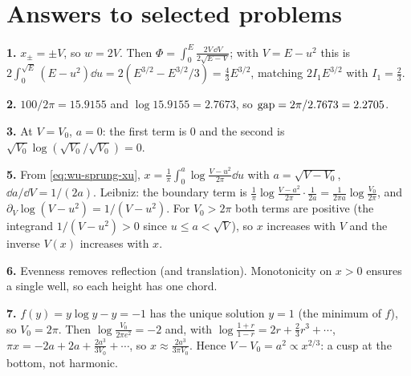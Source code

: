 \begin{problemlist}
\end{problemlist}

\section{Answers to selected problems}

\textbf{1.} $x_\pm=\pm V$, so $w=2V$. Then $\Phi=\int_0^E\frac{2V\,\dd V}{2\sqrt{E-V}}$; with $V=E-u^2$ this is $2\int_0^{\sqrt E}(E-u^2)\dd u=2(E^{3/2}-E^{3/2}/3)=\frac43E^{3/2}$, matching $2I_1E^{3/2}$ with $I_1=\frac23$.

\textbf{2.} $100/2\pi=15.9155$ and $\log15.9155=2.7673$, so $\mathrm{gap}=2\pi/2.7673=2.2705$.

\textbf{3.} At $V=V_0$, $a=0$: the first term is $0$ and the second is $\sqrt{V_0}\log(\sqrt{V_0}/\sqrt{V_0})=0$.

\textbf{5.} From \eqref{eq:wu-sprung-xu}, $x=\frac1\pi\int_0^a\log\frac{V-u^2}{2\pi}\dd u$ with $a=\sqrt{V-V_0}$, $\dd a/\dd V=1/(2a)$. Leibniz: the boundary term is $\frac1\pi\log\frac{V-a^2}{2\pi}\cdot\frac1{2a}=\frac1{2\pi a}\log\frac{V_0}{2\pi}$, and $\partial_V\log(V-u^2)=1/(V-u^2)$. For $V_0>2\pi$ both terms are positive (the integrand $1/(V-u^2)>0$ since $u\le a<\sqrt V$), so $x$ increases with $V$ and the inverse $V(x)$ increases with $x$.

\textbf{6.} Evenness removes reflection (and translation). Monotonicity on $x>0$ ensures a single well, so each height has one chord.

\textbf{7.} $f(y)=y\log y-y=-1$ has the unique solution $y=1$ (the minimum of $f$), so $V_0=2\pi$. Then $\log\frac{V_0}{2\pi e^2}=-2$ and, with $\log\frac{1+r}{1-r}=2r+\frac23r^3+\cdots$, $\pi x=-2a+2a+\frac{2a^3}{3V_0}+\cdots$, so $x\approx\frac{2a^3}{3\pi V_0}$. Hence $V-V_0=a^2\propto x^{2/3}$: a cusp at the bottom, not harmonic.

